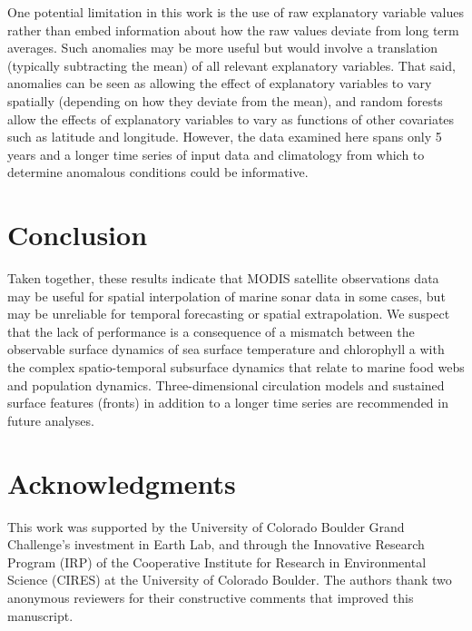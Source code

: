 \documentclass[10pt,letterpaper]{article}
\begin{document}
One potential limitation in this work is the use of raw explanatory variable values rather than embed information about how the raw values deviate from long term averages. 
Such anomalies may be more useful but would involve a translation (typically subtracting the mean) of all relevant explanatory variables.
That said, anomalies can be seen as allowing the effect of explanatory variables to vary spatially (depending on how they deviate from the mean), and random forests allow the effects of explanatory variables to vary as functions of other covariates such as latitude and longitude. However, the data examined here spans only 5 years and a longer time series of input data and climatology from which to determine anomalous conditions could be informative. 

\section*{Conclusion}

Taken together, these results indicate that MODIS satellite observations data may be useful for spatial interpolation of marine sonar data in some cases, but may be unreliable for temporal forecasting or spatial extrapolation. We suspect that the lack of performance is a consequence of a mismatch between the observable surface dynamics of sea surface temperature and chlorophyll a with the complex spatio-temporal subsurface dynamics that relate to marine food webs and population dynamics. Three-dimensional circulation models and sustained surface features (fronts) in addition to a longer time series are recommended in future analyses.

\section*{Acknowledgments}
This work was supported by the University of Colorado Boulder Grand Challenge's investment in Earth Lab, and through the Innovative Research Program (IRP) of the Cooperative Institute for Research in Environmental Science (CIRES) at the University of Colorado Boulder. The authors thank two anonymous reviewers for their constructive comments that improved this manuscript.

\nolinenumbers
\end{document}
